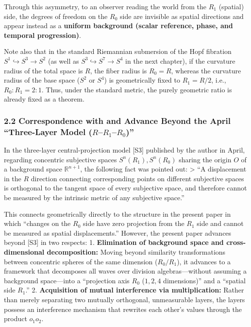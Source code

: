 \documentclass[
  a4paper,
]{article}
\begin{document}
Through this asymmetry, to an observer reading the world from the
\(R_1\) (spatial) side, the degrees of freedom on the \(R_0\) side are
invisible as spatial directions and appear instead as a \textbf{uniform
background (scalar reference, phase, and temporal progression)}.

Note also that in the standard Riemannian submersion of the Hopf
fibration \(S^1 \hookrightarrow S^3 \to S^2\) (as well as
\(S^3 \hookrightarrow S^7 \to S^4\) in the next chapter), if the
curvature radius of the total space is \(R\), the fiber radius is
\(R_0 = R\), whereas the curvature radius of the base space (\(S^2\) or
\(S^4\)) is geometrically fixed to \(R_1 = R/2\), i.e.,
\textbf{\(R_0 : R_1 = 2 : 1\)}. Thus, under the standard metric, the
purely geometric ratio is already fixed as a theorem.

\subsubsection{\texorpdfstring{2.2 Correspondence with and Advance
Beyond the April ``Three-Layer Model
(\(R\)--\(R_1\)--\(R_0\))''}{2.2 Correspondence with and Advance Beyond the April ``Three-Layer Model (R--R\_1--R\_0)''}}\label{correspondence-with-and-advance-beyond-the-april-three-layer-model-rr_1r_0}

In the three-layer central-projection model {[}S3{]} published by the
author in April, regarding concentric subjective spaces
\(S^n(R_1), S^n(R_0)\) sharing the origin \(O\) of a background space
\(\mathbb{R}^{n+1}\), the following fact was pointed out: \textgreater{}
``A displacement in the \(R\) direction connecting corresponding points
on different subjective spaces is orthogonal to the tangent space of
every subjective space, and therefore cannot be measured by the
intrinsic metric of any subjective space.''

This connects geometrically directly to the structure in the present
paper in which ``changes on the \(R_0\) side have zero projection from
the \(R_1\) side and cannot be measured as spatial displacements.''
However, the present paper advances beyond {[}S3{]} in two respects: 1.
\textbf{Elimination of background space and cross-dimensional
decomposition:} Moving beyond similarity transformations between
concentric spheres of the same dimension (\(R_0 / R_1\)), it advances to
a framework that decomposes all waves over division algebras---without
assuming a background space---into a ``projection axis \(R_0\)
(\(1, 2, 4\) dimensions)'' and a ``spatial side \(R_1\).'' 2.
\textbf{Acquisition of mutual interference via multiplication:} Rather
than merely separating two mutually orthogonal, unmeasurable layers, the
layers possess an interference mechanism that rewrites each other's
values through the product \(o_1 o_2\).
\end{document}
